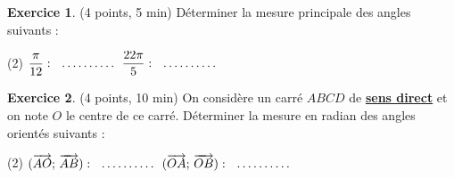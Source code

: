 \documentclass{article}
\theoremstyle{definition}
\newtheorem{exercice}{Exercice}
\begin{document}
\vfill

\begin{exercice}{(4 points, 5 min)}
  Déterminer la mesure principale des angles suivants :
  \begin{tasks}[style=itemize, label=](2)
    \task $\dfrac{\pi}{12}: {\makebox[5em]{\enspace\dotfill}}$
    \task $\dfrac{22\pi}{5}: {\makebox[5em]{\enspace\dotfill}}$
  \end{tasks}
\end{exercice}

\vfill

% 

\begin{exercice}{(4 points, 10 min)}
  On considère un carré $ABCD$ de
  \underline{\textbf{sens direct}}
  et on note $O$ le centre de ce carré.
  Déterminer la mesure en radian des angles orientés suivants :
  \begin{tasks}[style=itemize, label=](2)
    \task $(\overrightarrow{AO};\, \overrightarrow{AB}): {\makebox[5em]{\enspace\dotfill}}$
    \task $(\overrightarrow{OA};\, \overrightarrow{OB}): {\makebox[5em]{\enspace\dotfill}}$
  \end{tasks}
\end{exercice}

\vfill
\end{document}
